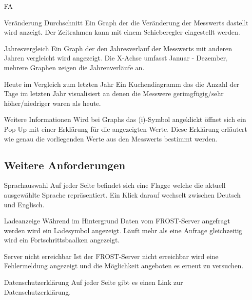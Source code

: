 \begin{Kriterien}{FA}
 \item[Veränderung Durchschnitt]
   Ein Graph der die Veränderung der \glspl{Messwert} dastellt wird anzeigt.
   Der Zeitrahmen kann mit einem Schieberegler eingestellt werden.

 \item[Jahresvergleich]
   Ein Graph der den Jahresverlauf der \glspl{Messwert} mit anderen Jahren vergleicht wird angezeigt.
   Die X-Achse umfasst Januar - Dezember, mehrere Graphen zeigen die Jahrenverläufe an.

 \item[Heute im Vergleich zum letzten Jahr]
   Ein \gls{Kuchendiagramm} das die Anzahl der Tage im letzten Jahr visualisiert an denen die Messwere gerimgfügig/sehr höher/niedriger waren als heute.

 \item[Weitere Informationen]
   Wird bei \glspl{Graph} das (i)-Symbol angeklickt öffnet sich ein \gls{Pop-Up} mit einer Erklärung für die angezeigten Werte.
   Diese Erklärung erläutert wie genau die vorliegenden Werte aus den \glspl{Messwert} bestimmt werden.

\subsection{Weitere Anforderungen}

 \item[Sprachauswahl]
   Auf jeder Seite befindet sich eine Flagge welche die aktuell ausgewählte Sprache repräsentiert.
   Ein Klick darauf wechselt zwischen Deutsch und Englisch.

 \item[Ladeanzeige]
  Während im Hintergrund Daten vom \gls{FROST-Server} angefragt werden wird ein Ladesymbol angezeigt.
  Läuft mehr als eine Anfrage gleichzeitig wird ein Fortschrittsbaalken angezeigt.

 \item[Server nicht erreichbar]
  Ist der \gls{FROST-Server} nicht erreichbar wird eine Fehlermeldung angezeigt und die Möglichkeit angeboten es erneut zu versuchen.

 \item[Datenschutzerklärung]
  Auf jeder Seite gibt es einen Link zur Datenschutzerklärung.

\end{Kriterien}